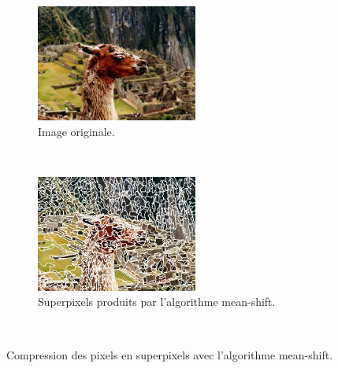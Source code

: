 \begin{figure}[htb]
	\centering
	 \begin{subfigure}[t]{0.45\textwidth}	
			\includegraphics[width=\textwidth]{images/etat-de-l-art/meanshit_im}
		 \caption{Image originale. }
			\label{fig:sota:app_contexts_rv}
	\end{subfigure}
	~
	 \begin{subfigure}[t]{0.45\textwidth}	
			\includegraphics[width=\textwidth]{images/etat-de-l-art/meanshit_ex}
		 \caption{Superpixels produits par l'algorithme mean-shift.}
			\label{fig:sota:app_contexts_ocr}
	\end{subfigure}
	~
	\caption{Compression des pixels en superpixels avec l'algorithme mean-shift.}
	\label{fig:sota:meanshift}
\end{figure}


